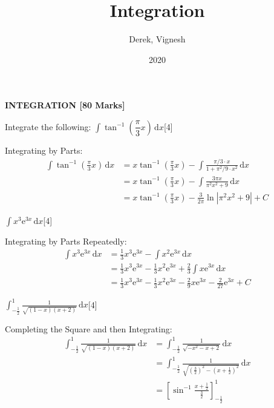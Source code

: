 \documentclass[12pt, a4 paper]{article}
\title{Integration}
\author{Derek, Vignesh}
\date{2020}
\begin{document}
\maketitle

\textbf{INTEGRATION [80 Marks]}
\begin{outline}[enumerate]
	\1 Integrate the following:
	\2 $\int \tan^{-1}(\dfrac{\pi}{3}x)\,\mathrm{d}x$\hfill[4]
	\begin{answer}
		Integrating by Parts:
		\begin{align*}
			\int \tan^{-1}(\frac{\pi}{3}x)\,\mathrm{d}x
			  & = x\tan^{-1}(\frac{\pi}{3}x)-\int\frac{\pi/3\cdot x}{1+\pi^2/9\cdot x^2}\,\mathrm{d}x \\&= x\tan^{-1}(\frac{\pi}{3}x)-\int \frac{3\pi x}{\pi^2x^2+9}\,\mathrm{d}x \\
			  & = x\tan^{-1}(\frac{\pi}{3}x) - \frac{3}{2\pi}\ln{|\pi^2x^2+9|} + C                    
		\end{align*}
	\end{answer}
	\2 $\int x^3\mathrm{e}^{3x} \,\mathrm{d}x$\hfill[4]
	\begin{answer}
		Integrating by Parts Repeatedly:
		\begin{align*}
			\int x^3\mathrm{e}^{3x} \,\mathrm{d}x & = \frac{1}{3}x^3\mathrm{e}^{3x}-\int x^2\mathrm{e}^{3x}\,\mathrm{d}x                                                          \\&=\frac{1}{3}x^3\mathrm{e}^{3x} - \frac{1}{3}x^2\mathrm{e}^{3x}+\frac{2}{3}\int x\mathrm{e}^{3x}\,\mathrm{d}x \\
			                                      & = \frac{1}{3}x^3\mathrm{e}^{3x} - \frac{1}{3}x^2\mathrm{e}^{3x} - \frac{2}{9}x\mathrm{e}^{3x} - \frac{2}{27}\mathrm{e}^{3x}+C 
		\end{align*}
	\end{answer}
	\2 $\int_{-\frac{1}{2}}^1 \frac{1}{\sqrt{(1-x)(x+2)}}\,\mathrm{d}x$\hfill[4]
	\begin{answer}
		Completing the Square and then Integrating:
		\begin{align*}
			\int_{-\frac{1}{2}}^1 \frac{1}{\sqrt{(1-x)(x+2)}}\,\mathrm{d}x & = \int_{-\frac{1}{2}}^1 \frac{1}{\sqrt{-x^2-x+2}}\,\mathrm{d}x    \\&= \int_{-\frac{1}{2}}^1 \frac{1}{\sqrt{(\frac{3}{2})^2-(x+\frac{1}{2})^2}}\,\mathrm{d}x \\
			                                                               & = [\sin^{-1}{\frac{x+\frac{1}{2}}{\frac{3}{2}}}]_{-\frac{1}{2}}^1 \\

\end{align*}
\end{answer}
\end{outline}
\end{document}
